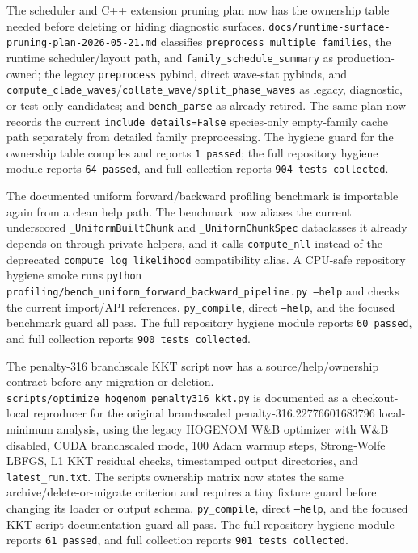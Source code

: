 \documentclass[11pt]{article}
\begin{document}
The scheduler and C++ extension pruning plan now has the ownership table needed
before deleting or hiding diagnostic surfaces.  \texttt{docs/runtime-surface-pruning-plan-2026-05-21.md}
classifies \texttt{preprocess\_multiple\_families}, the runtime scheduler/layout
path, and \texttt{family\_schedule\_summary} as production-owned; the legacy
\texttt{preprocess} pybind, direct wave-stat pybinds, and
\texttt{compute\_clade\_waves}/\texttt{collate\_wave}/\texttt{split\_phase\_waves}
as legacy, diagnostic, or test-only candidates; and \texttt{bench\_parse} as
already retired.  The same plan now records the current
\texttt{include\_details=False} species-only empty-family cache path separately
from detailed family preprocessing.  The hygiene guard for the ownership table
compiles and reports \texttt{1 passed}; the full repository hygiene module
reports \texttt{64 passed}, and full collection reports \texttt{904 tests
collected}.

The documented uniform forward/backward profiling benchmark is importable again
from a clean help path.  The benchmark now aliases the current underscored
\texttt{\_UniformBuiltChunk} and \texttt{\_UniformChunkSpec} dataclasses it
already depends on through private helpers, and it calls \texttt{compute\_nll}
instead of the deprecated \texttt{compute\_log\_likelihood} compatibility alias.
A CPU-safe repository hygiene smoke runs
\texttt{python profiling/bench\_uniform\_forward\_backward\_pipeline.py --help}
and checks the current import/API references.  \texttt{py\_compile}, direct
\texttt{--help}, and the focused benchmark guard all pass.  The full repository
hygiene module reports \texttt{60 passed}, and full collection reports
\texttt{900 tests collected}.

The penalty-316 branchscale KKT script now has a source/help/ownership contract
before any migration or deletion.  \texttt{scripts/optimize\_hogenom\_penalty316\_kkt.py}
is documented as a checkout-local reproducer for the original branchscaled
penalty-316.22776601683796 local-minimum analysis, using the legacy HOGENOM
W\&B optimizer with W\&B disabled, CUDA branchscaled mode, 100 Adam warmup
steps, Strong-Wolfe LBFGS, L1 KKT residual checks, timestamped output
directories, and \texttt{latest\_run.txt}.  The scripts ownership matrix now
states the same archive/delete-or-migrate criterion and requires a tiny fixture
guard before changing its loader or output schema.  \texttt{py\_compile},
direct \texttt{--help}, and the focused KKT script documentation guard all
pass.  The full repository hygiene module reports \texttt{61 passed}, and full
collection reports \texttt{901 tests collected}.
\end{document}
